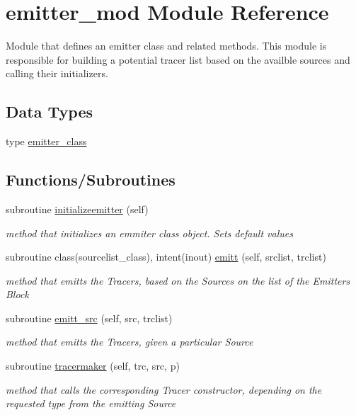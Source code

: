 \hypertarget{namespaceemitter__mod}{}\section{emitter\+\_\+mod Module Reference}
\label{namespaceemitter__mod}


Module that defines an emitter class and related methods. This module is responsible for building a potential tracer list based on the availble sources and calling their initializers.  


\subsection*{Data Types}
\begin{DoxyCompactItemize}
\item 
type \mbox{\hyperlink{structemitter__mod_1_1emitter__class}{emitter\+\_\+class}}
\end{DoxyCompactItemize}
\subsection*{Functions/\+Subroutines}
\begin{DoxyCompactItemize}
\item 
subroutine \mbox{\hyperlink{namespaceemitter__mod_a6376ad0f8e1739b29caf672aa0750373}{initializeemitter}} (self)
\begin{DoxyCompactList}\small\item\em method that initializes an emmiter class object. Sets default values \end{DoxyCompactList}\item 
subroutine class(sourcelist\+\_\+class), intent(inout) \mbox{\hyperlink{namespaceemitter__mod_a5127564ae5d2f00d214c1518ac420da7}{emitt}} (self, srclist, trclist)
\begin{DoxyCompactList}\small\item\em method that emitts the Tracers, based on the Sources on the list of the Emitter\textquotesingle{}s Block \end{DoxyCompactList}\item 
subroutine \mbox{\hyperlink{namespaceemitter__mod_a942679c07927fa594173fdd02da38922}{emitt\+\_\+src}} (self, src, trclist)
\begin{DoxyCompactList}\small\item\em method that emitts the Tracers, given a particular Source \end{DoxyCompactList}\item 
subroutine \mbox{\hyperlink{namespaceemitter__mod_aee7b24637d2249727bccab333e062516}{tracermaker}} (self, trc, src, p)
\begin{DoxyCompactList}\small\item\em method that calls the corresponding Tracer constructor, depending on the requested type from the emitting Source \end{DoxyCompactList}\end{DoxyCompactItemize}


